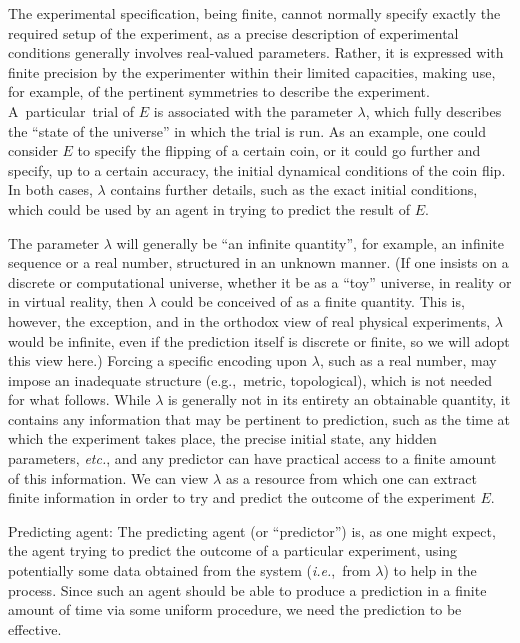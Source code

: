 \documentclass[information,article,accept,moreauthors,pdftex,12pt,a4paper]{mdpi}
\theoremstyle{mdpi}
\newcounter{ex}
\newcounter{re}
\theoremstyle{mdpidefinition}
\begin{document}
The experimental specification, being finite, cannot normally specify exactly the required setup of the experiment, as a precise description of experimental conditions generally involves real-valued parameters.
Rather, it is expressed with finite precision
by the experimenter within their limited capacities, making use, for example, of the pertinent symmetries to describe the experiment.
\mbox{A particular trial} of $E$ is associated with the parameter $\lambda$, which fully describes the ``state of the universe'' in which the trial is run.
As an example, one could consider $E$ to specify the flipping of a certain coin, or it could go further and specify, up to a certain accuracy, the initial dynamical conditions of the coin flip.
In both cases, $\lambda$ contains further details, such as the exact initial conditions, which could be used by an agent in trying to predict the result of $E$.

The parameter $\lambda$ will generally
be ``an infinite quantity'', for example, an infinite sequence or a real number, structured in an unknown manner.
(If one insists on a discrete or computational universe, whether it be as a ``toy'' universe, in reality or in virtual reality, then $\lambda$ could be conceived of as a finite quantity. This is, however, the exception, and in the orthodox view of real physical experiments, $\lambda$ would be infinite, even if the prediction itself is discrete or finite, so we will adopt this view here.)
Forcing a specific encoding upon $\lambda$, such as a real number, may impose an inadequate structure (e.g.,\ metric, topological), which is not needed for what follows.
While $\lambda$ is generally not in its entirety an obtainable quantity, it contains any information that may be pertinent to prediction, such as the time at which the experiment takes place, the precise initial state, any hidden parameters, \emph{etc.}, and any predictor can have practical access to a finite amount of this information.
We can view $\lambda$ as a resource from which one can extract finite information in order to try and predict the outcome of the experiment $E$.


{Predicting agent:}
The predicting agent (or ``predictor'') is, as one might expect, the agent trying to predict the outcome of a particular experiment, using potentially some data obtained from the system (\emph{i.e.},\ from $\lambda$) to help in the process.
Since such an agent should be able to produce a prediction in a finite amount of time via some uniform procedure, we need the prediction to be {effective}.
\end{document}
